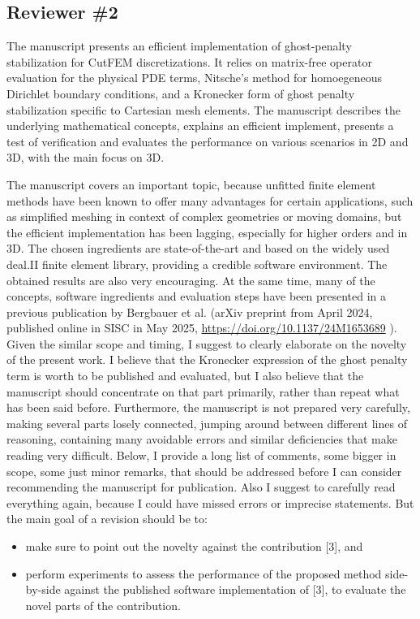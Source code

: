 \documentclass[11pt, a4paper]{article}
\newcommand{\reviewer}[1]{\subsection*{#1}}
\begin{document}
\reviewer{Reviewer \#2}

The manuscript presents an efficient implementation of ghost-penalty stabilization for CutFEM discretizations. It
relies on matrix-free operator evaluation for the physical PDE terms, Nitsche's method for homoegeneous Dirichlet
boundary conditions, and a Kronecker form of ghost penalty stabilization specific to Cartesian mesh elements. The
manuscript describes the underlying mathematical concepts, explains an efficient implement, presents a test of
verification and evaluates the performance on various scenarios in 2D and 3D, with the main focus on 3D.

The manuscript covers an important topic, because unfitted finite element methods have been known to offer many
advantages for certain applications, such as simplified meshing in context of complex geometries or moving domains, but
the efficient implementation has been lagging, especially for higher orders and in 3D. The chosen ingredients are
state-of-the-art and based on the widely used deal.II finite element library, providing a credible software
environment. The obtained results are also very encouraging. At the same time, many of the concepts, software
ingredients and evaluation steps have been presented in a previous publication by Bergbauer et al. (arXiv preprint from
April 2024, published online in SISC in May 2025, \url{https://doi.org/10.1137/24M1653689} ). Given the similar scope
and timing, I suggest to clearly elaborate on the novelty of the present work. I believe that the Kronecker expression
of the ghost penalty term is worth to be published and evaluated, but I also believe that the manuscript should
concentrate on that part primarily, rather than repeat what has been said before. Furthermore, the manuscript is not
prepared very carefully, making several parts losely connected, jumping around between different lines of reasoning,
containing many avoidable errors and similar deficiencies that make reading very difficult. Below, I provide a long
list of comments, some bigger in scope, some just minor remarks, that should be addressed before I can consider
recommending the manuscript for publication. Also I suggest to carefully read everything again, because I could have
missed errors or imprecise statements. But the main goal of a revision should be to:
\begin{itemize}
      \item[a)] make sure to point out the novelty against the contribution [3], and
      \item[b)] perform experiments to assess the performance of the proposed method side-by-side against the published
            software implementation of [3], to evaluate the novel parts of the contribution.
\end{itemize}
\end{document}
